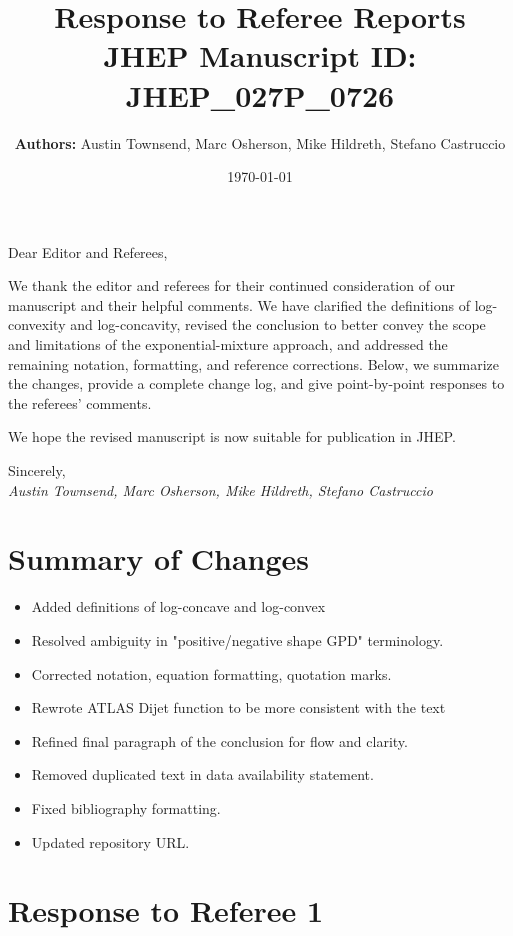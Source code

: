 \documentclass[11pt,a4paper]{article}
\title{\textbf{Response to Referee Reports}\\
\large JHEP Manuscript ID: JHEP\_027P\_0726}
\author{\textbf{Authors:} Austin Townsend, Marc Osherson, Mike Hildreth, Stefano Castruccio}
\date{\today}
\begin{document}
\maketitle

\noindent Dear Editor and Referees,

\medskip
We thank the editor and referees for their continued consideration of our manuscript and their helpful comments. We have clarified the definitions of log-convexity and log-concavity, revised the conclusion to better convey the scope and limitations of the exponential-mixture approach, and addressed the remaining notation, formatting, and reference corrections. Below, we summarize the changes, provide a complete change log, and give point-by-point responses to the referees’ comments.
\bigskip

\noindent We hope the revised manuscript is now suitable for publication in JHEP.

\bigskip
\noindent Sincerely,\\
\textit{Austin Townsend, Marc Osherson, Mike Hildreth, Stefano Castruccio}


\section*{Summary of Changes}

\begin{itemize}
\item Added definitions of log-concave and log-convex
\item Resolved ambiguity in "positive/negative shape GPD" terminology.
\item Corrected notation, equation formatting, quotation marks.
\item Rewrote ATLAS Dijet function to be more consistent with the text
\item Refined final paragraph of the conclusion for flow and clarity.
\item Removed duplicated text in data availability statement.
\item Fixed bibliography formatting.
\item Updated repository URL.
\end{itemize}
\clearpage

\section*{Response to Referee 1}
\end{document}
